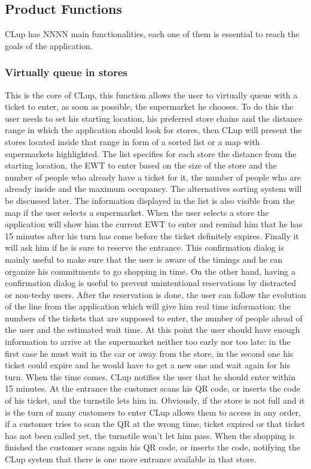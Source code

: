 \subsection{\sffamily Product Functions}
CLup has NNNN main functionalities, each one of them is essential to reach the goals of the application.\\

\subsubsection{\sffamily Virtually queue in stores}
This is the core of CLup, this function allows the user to virtually queue with a ticket to enter, as soon as possible, the supermarket he chooses. To do this the user needs to set his starting location, his preferred store chains and the distance range in which the application should look for stores, then CLup will present the stores located inside that range in form of a sorted list or a map with supermarkets highlighted. The list specifies for each store the distance from the starting location, the EWT to enter based on the size of the store and the number of people who already have a ticket for it, the number of people who are already inside and the maximum occupancy. The alternatives sorting system will be discussed later. The information displayed in the list is also visible from the map if the user selects a supermarket. When the user selects a store the application will show him the current EWT to enter and remind him that he has 15 minutes after his turn has come before the ticket definitely expires. Finally it will ask him if he is sure to reserve the entrance. This confirmation dialog is mainly useful to make sure that the user is aware of the timings and he can organize his commitments to go shopping in time. On the other hand, having a confirmation dialog is useful to prevent unintentional reservations by distracted or non-techy users. After the reservation is done, the user can follow the evolution of the line from the application which will give him real time information: the numbers of the tickets that are supposed to enter, the number of people ahead of the user and the estimated wait time. At this point the user should have enough information to arrive at the supermarket neither too early nor too late: in the first case he must wait in the car or away from the store, in the second one his ticket could expire and he would have to get a new one and wait again for his turn. When the time comes, CLup notifies the user that he should enter within 15 minutes. At the entrance the customer scans his QR code, or inserts the code of his ticket, and the turnstile lets him in. Obviously, if the store is not full and it is the turn of many customers to enter CLup allows them to access in any order, if a customer tries to scan the QR at the wrong time, ticket expired or that ticket has not been called yet, the turnstile won’t let him pass. When the shopping is finished the customer scans again his QR code, or inserts the code, notifying the CLup system that there is one more entrance available in that store.
